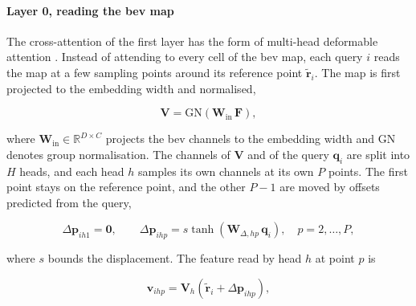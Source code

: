 
\paragraph{Layer 0, reading the \ac{bev} map}
\label{subsec:design-layer0}

The cross-attention of the first layer has the form of multi-head deformable attention
\cite{Zhu2021DeformableDETR}. Instead of attending to every cell of the \ac{bev} map, each query $i$ reads the
map at a few sampling points around its reference point $\tilde{\mathbf{r}}_i$. The map is first projected to
the embedding width and normalised,

\begin{equation}
    \mathbf{V} = \mathrm{GN}\!\left( \mathbf{W}_{\mathrm{in}}\, \mathbf{F} \right),
    \label{eq:design-layer0-proj}
\end{equation}

where $\mathbf{W}_{\mathrm{in}} \in \mathbb{R}^{D \times C}$ projects the \ac{bev} channels to the embedding
width and $\mathrm{GN}$ denotes group normalisation. The channels of $\mathbf{V}$ and of the query
$\mathbf{q}_i$ are split into $H$ heads, and each head $h$ samples its own channels at its own $P$ points.
The first point stays on the reference point, and the other $P-1$ are moved by offsets predicted from the
query,

\begin{equation}
    \Delta\mathbf{p}_{ih1} = \mathbf{0}, \qquad
    \Delta\mathbf{p}_{ihp} = s \tanh\!\left( \mathbf{W}_{\Delta,hp}\, \mathbf{q}_i \right),
    \quad p = 2, \dots, P,
    \label{eq:design-layer0-offsets}
\end{equation}

where $s$ bounds the displacement. The feature read by head $h$ at point $p$ is

\begin{equation}
    \mathbf{v}_{ihp} = \mathbf{V}_h\!\left( \tilde{\mathbf{r}}_i + \Delta\mathbf{p}_{ihp} \right),
    \label{eq:design-layer0-sample}
\end{equation}

